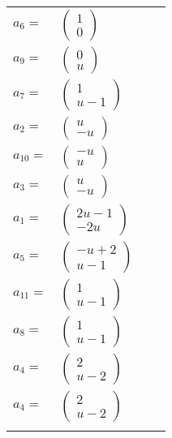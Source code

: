 \documentclass[1p]{elsarticle_modified}
\theoremstyle{definition}
\begin{document}
\begin{tabular}{m{7pt} m{180pt} m{7pt} m{180pt} }
\flushright $a_{6}=$&$\begin{pmatrix}1\\0\end{pmatrix}$ \\
\flushright $a_{9}=$&$\begin{pmatrix}0\\u\end{pmatrix}$ \\
\flushright $a_{7}=$&$\begin{pmatrix}1\\u-1\end{pmatrix}$ \\
\flushright $a_{2}=$&$\begin{pmatrix}u\\- u\end{pmatrix}$ \\
\flushright $a_{10}=$&$\begin{pmatrix}- u\\u\end{pmatrix}$ \\
\flushright $a_{3}=$&$\begin{pmatrix}u\\- u\end{pmatrix}$ \\
\flushright $a_{1}=$&$\begin{pmatrix}2 u-1\\-2 u\end{pmatrix}$ \\
\flushright $a_{5}=$&$\begin{pmatrix}- u+2\\u-1\end{pmatrix}$ \\
\flushright $a_{11}=$&$\begin{pmatrix}1\\u-1\end{pmatrix}$ \\
\flushright $a_{8}=$&$\begin{pmatrix}1\\u-1\end{pmatrix}$ \\
\flushright $a_{4}=$&$\begin{pmatrix}2\\u-2\end{pmatrix}$\\ \flushright $a_{4}=$&$\begin{pmatrix}2\\u-2\end{pmatrix}$\\&\end{tabular}
\end{document}
